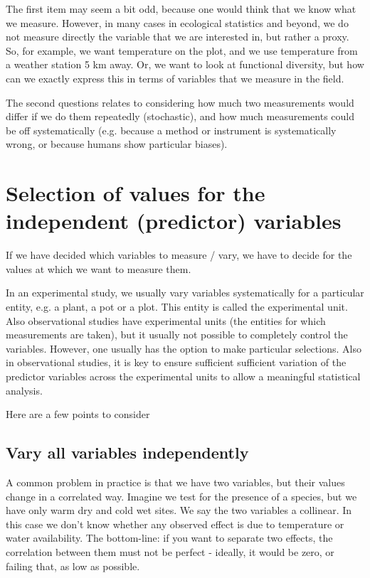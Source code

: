 \documentclass[a4paper,twoside]{tufte-book}\usepackage[]{graphicx}\usepackage[]{color}
\begin{document}
The first item may seem a bit odd, because one would think that we know what we measure. However, in many cases in ecological statistics and beyond, we do not measure directly the variable that we are interested in, but rather a proxy. So, for example, we want temperature on the plot, and we use temperature from a weather station 5 km away. Or, we want to look at functional diversity, but how can we exactly express this in terms of variables that we measure in the field.

The second questions relates to considering how much two measurements would differ if we do them repeatedly (stochastic), and how much measurements could be off systematically (e.g. because a method or instrument is systematically wrong, or because humans show particular biases).


\section{Selection of values for the independent (predictor) variables}

If we have decided which variables to measure / vary, we have to decide for the values at which we want to measure them. 

In an experimental study, we usually vary variables systematically for a particular entity, e.g. a plant, a pot or a plot. This entity is called the experimental unit. Also observational studies have experimental units (the entities for which measurements are taken), but it usually not possible to completely control the variables. However, one usually has the option to make particular selections. Also in observational studies, it is key to ensure sufficient sufficient variation of the predictor variables across the experimental units to allow a meaningful statistical analysis.

Here are a few points to consider

\subsection{Vary all variables independently}

A common problem in practice is that we have two variables,  but their values change in a correlated way. Imagine we test for the presence of a species, but we have only warm dry and cold wet sites. We say the two variables a collinear. In this case we don't know whether any observed effect is due to temperature or water availability. The bottom-line: if you want to separate two effects, the correlation between them must not be perfect - ideally, it would be zero, or failing that, as low as possible. 
\end{document}
